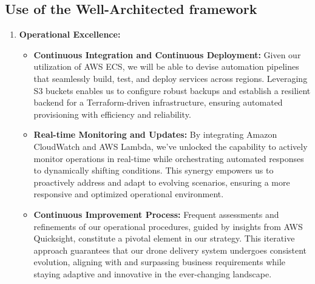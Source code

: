 \documentclass{article}
\begin{document}
\subsection{Use of the Well-Architected framework}
\begin{enumerate}
    \item \textbf{Operational Excellence:}\cite{Operational Excellence}
    \begin{itemize}
        \item \textbf{Continuous Integration and Continuous Deployment:}  Given our utilization of AWS ECS, we will be able to devise automation pipelines that seamlessly build, test, and deploy services across regions. Leveraging S3 buckets enables us to configure robust backups and establish a resilient backend for a Terraform-driven infrastructure, ensuring automated provisioning with efficiency and reliability.
        \item \textbf{Real-time Monitoring and Updates:}
        By integrating Amazon CloudWatch and AWS Lambda, we've unlocked the capability to actively monitor operations in real-time while orchestrating automated responses to dynamically shifting conditions. This synergy empowers us to proactively address and adapt to evolving scenarios, ensuring a more responsive and optimized operational environment.
        \item \textbf{Continuous Improvement Process:} Frequent assessments and refinements of our operational procedures, guided by insights from AWS Quicksight, constitute a pivotal element in our strategy. This iterative approach guarantees that our drone delivery system undergoes consistent evolution, aligning with and surpassing business requirements while staying adaptive and innovative in the ever-changing landscape.
    \end{itemize}


\end{enumerate}
\end{document}
